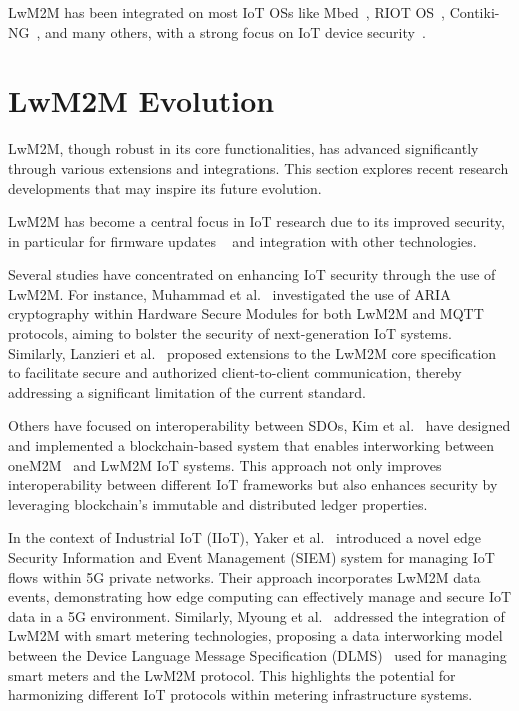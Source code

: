 \documentclass[11pt,sigconf]{iabart}
\begin{document}
LwM2M has been integrated on most IoT OSs like Mbed~\cite{mbed}, RIOT OS~\cite{riot_os}, Contiki-NG~\cite{contiki_ng}, and many others, with a strong focus on IoT device security~\cite{pop00010}.

\section{LwM2M Evolution} \label{extensions}

LwM2M, though robust in its core functionalities, has advanced significantly through various extensions and integrations. This section explores recent research developments that may inspire its future evolution.

LwM2M has become a central focus in IoT research due to its improved security, in particular for firmware updates ~\cite{8725488} and integration with other technologies. 

Several studies have concentrated on enhancing IoT security through the use of LwM2M. For instance, Muhammad et al.~\cite{pop00001} investigated the use of ARIA cryptography within Hardware Secure Modules for both LwM2M and MQTT protocols, aiming to bolster the security of next-generation IoT systems. Similarly, Lanzieri et al.~\cite{pop00011} proposed extensions to the LwM2M core specification to facilitate secure and authorized client-to-client communication, thereby addressing a significant limitation of the current standard.

Others have focused on interoperability between SDOs, Kim et al.~\cite{pop00007} have designed and implemented a blockchain-based system that enables interworking between oneM2M~\cite{oneM2M-spec} and LwM2M IoT systems. This approach not only improves interoperability between different IoT frameworks but also enhances security by leveraging blockchain's immutable and distributed ledger properties.

In the context of Industrial IoT (IIoT), Yaker et al.~\cite{pop00004} introduced a novel edge Security Information and Event Management (SIEM) system for managing IoT flows within 5G private networks. Their approach incorporates LwM2M data events, demonstrating how edge computing can effectively manage and secure IoT data in a 5G environment. Similarly, Myoung et al.~\cite{pop00012} addressed the integration of LwM2M with smart metering technologies, proposing a data interworking model between the Device Language Message Specification (DLMS)~\cite{dlms-spec} used for managing smart meters and the LwM2M protocol. This highlights the potential for harmonizing different IoT protocols within metering infrastructure systems.
\end{document}
